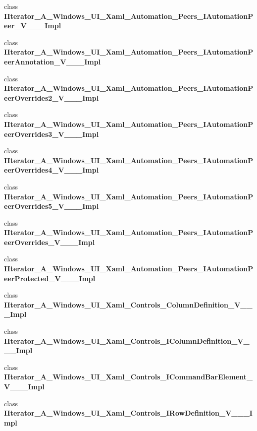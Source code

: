 \begin{DoxyCompactItemize}
\item 
class {\bfseries I\+Iterator\+\_\+\+A\+\_\+\+Windows\+\_\+\+U\+I\+\_\+\+Xaml\+\_\+\+Automation\+\_\+\+Peers\+\_\+\+I\+Automation\+Peer\+\_\+\+V\+\_\+\+\_\+\+\_\+\+Impl}
\item 
class {\bfseries I\+Iterator\+\_\+\+A\+\_\+\+Windows\+\_\+\+U\+I\+\_\+\+Xaml\+\_\+\+Automation\+\_\+\+Peers\+\_\+\+I\+Automation\+Peer\+Annotation\+\_\+\+V\+\_\+\+\_\+\+\_\+\+Impl}
\item 
class {\bfseries I\+Iterator\+\_\+\+A\+\_\+\+Windows\+\_\+\+U\+I\+\_\+\+Xaml\+\_\+\+Automation\+\_\+\+Peers\+\_\+\+I\+Automation\+Peer\+Overrides2\+\_\+\+V\+\_\+\+\_\+\+\_\+\+Impl}
\item 
class {\bfseries I\+Iterator\+\_\+\+A\+\_\+\+Windows\+\_\+\+U\+I\+\_\+\+Xaml\+\_\+\+Automation\+\_\+\+Peers\+\_\+\+I\+Automation\+Peer\+Overrides3\+\_\+\+V\+\_\+\+\_\+\+\_\+\+Impl}
\item 
class {\bfseries I\+Iterator\+\_\+\+A\+\_\+\+Windows\+\_\+\+U\+I\+\_\+\+Xaml\+\_\+\+Automation\+\_\+\+Peers\+\_\+\+I\+Automation\+Peer\+Overrides4\+\_\+\+V\+\_\+\+\_\+\+\_\+\+Impl}
\item 
class {\bfseries I\+Iterator\+\_\+\+A\+\_\+\+Windows\+\_\+\+U\+I\+\_\+\+Xaml\+\_\+\+Automation\+\_\+\+Peers\+\_\+\+I\+Automation\+Peer\+Overrides5\+\_\+\+V\+\_\+\+\_\+\+\_\+\+Impl}
\item 
class {\bfseries I\+Iterator\+\_\+\+A\+\_\+\+Windows\+\_\+\+U\+I\+\_\+\+Xaml\+\_\+\+Automation\+\_\+\+Peers\+\_\+\+I\+Automation\+Peer\+Overrides\+\_\+\+V\+\_\+\+\_\+\+\_\+\+Impl}
\item 
class {\bfseries I\+Iterator\+\_\+\+A\+\_\+\+Windows\+\_\+\+U\+I\+\_\+\+Xaml\+\_\+\+Automation\+\_\+\+Peers\+\_\+\+I\+Automation\+Peer\+Protected\+\_\+\+V\+\_\+\+\_\+\+\_\+\+Impl}
\item 
class {\bfseries I\+Iterator\+\_\+\+A\+\_\+\+Windows\+\_\+\+U\+I\+\_\+\+Xaml\+\_\+\+Controls\+\_\+\+Column\+Definition\+\_\+\+V\+\_\+\+\_\+\+\_\+\+Impl}
\item 
class {\bfseries I\+Iterator\+\_\+\+A\+\_\+\+Windows\+\_\+\+U\+I\+\_\+\+Xaml\+\_\+\+Controls\+\_\+\+I\+Column\+Definition\+\_\+\+V\+\_\+\+\_\+\+\_\+\+Impl}
\item 
class {\bfseries I\+Iterator\+\_\+\+A\+\_\+\+Windows\+\_\+\+U\+I\+\_\+\+Xaml\+\_\+\+Controls\+\_\+\+I\+Command\+Bar\+Element\+\_\+\+V\+\_\+\+\_\+\+\_\+\+Impl}
\item 
class {\bfseries I\+Iterator\+\_\+\+A\+\_\+\+Windows\+\_\+\+U\+I\+\_\+\+Xaml\+\_\+\+Controls\+\_\+\+I\+Row\+Definition\+\_\+\+V\+\_\+\+\_\+\+\_\+\+Impl}

\end{DoxyCompactItemize}

